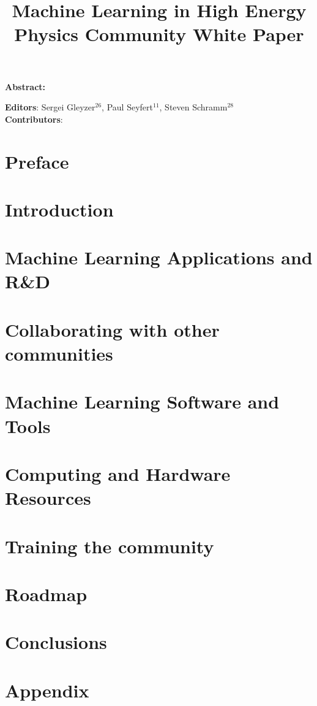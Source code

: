 \documentclass{article}
\begin{document}
\title{Machine Learning in High Energy Physics Community White Paper}

\maketitle

\setlength\parindent{0pt}
\textbf{Abstract:}

\vskip 1cm
\textbf{Editors}: Sergei Gleyzer$^{26}$, Paul Seyfert$^{11}$, Steven Schramm$^{28}$\\
\newline
\textbf{Contributors}:


\tableofcontents
\clearpage

\section{Preface}
\label{sec:preface}


\section{Introduction}
\label{sec:introduction}


\section{Machine Learning Applications and R\&D}
\label{sec:applications}


\section{Collaborating with other communities}
\label{sec:collaboration}


\section{Machine Learning Software and Tools}
\label{sec:software}


\section{Computing and Hardware Resources}
\label{sec:resources}


\section{Training the community}
\label{sec:training}


\section{Roadmap}
\label{sec:roadmap}


\section{Conclusions}
\label{sec:conclusions}


\appendix
\section{Appendix}
\label{sec:appendix}

\clearpage

\printbibliography[title={References}]
\end{document}
